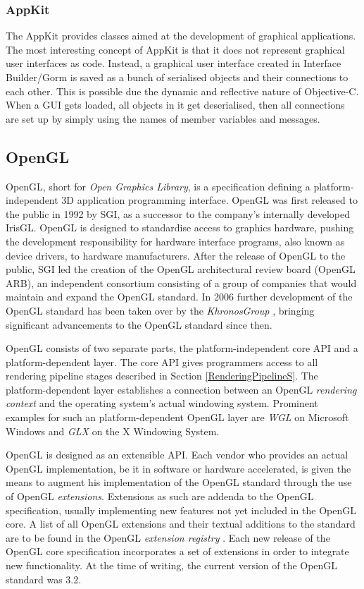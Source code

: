 \subsubsection{AppKit}

The AppKit provides classes aimed at the development of graphical applications.
The most interesting concept of AppKit is that it does not represent graphical
user interfaces as code. Instead, a graphical user interface created in
Interface Builder/Gorm is saved as a bunch of serialised objects and their
connections to each other. This is possible due the dynamic and reflective
nature of Objective-C. When a GUI gets loaded, all objects in it get
deserialised, then all connections are set up by simply using the names of
member variables and messages. 

\subsection{OpenGL}
OpenGL, short for \textit{Open Graphics Library}, is a specification defining a
platform-independent 3D application programming interface. OpenGL was first
released to the public in 1992 by SGI, as a successor to the company's
internally developed IrisGL. OpenGL is designed to standardise access to
graphics hardware, pushing the development responsibility for hardware interface
programs, also known as device drivers, to hardware manufacturers. After the
release of OpenGL to the public, SGI led the creation of the OpenGL
architectural review board (OpenGL ARB)\cite{misc:opengl-arb}, an independent
consortium consisting of a group of companies that would maintain and expand the
OpenGL standard. In 2006 further development of the OpenGL standard has been
taken over by the \textit{KhronosGroup} \cite{misc:opengl-khronos}, bringing
significant advancements to the OpenGL standard since then.

OpenGL consists of two separate parts, the platform-independent core API and a
platform-dependent layer. The core API gives programmers access to all
rendering pipeline stages described in Section \ref{RenderingPipelineS}. The
platform-dependent layer establishes a connection between an OpenGL
\textit{rendering context} and the operating system's actual windowing system.
Prominent examples for such an platform-dependent OpenGL layer are \textit{WGL}
on Microsoft Windows and \textit{GLX} on the X Windowing System.

OpenGL is designed as an extensible API. Each vendor who provides an actual
OpenGL implementation, be it in software or hardware accelerated, is given the
means to augment his implementation of the OpenGL standard through the use of
OpenGL \textit{extensions}. Extensions as such are addenda to the OpenGL
specification, usually implementing new features not yet included in the OpenGL
core. A list of all OpenGL extensions and their textual additions to the
standard are to be found in the OpenGL \textit{extension
registry} \cite{misc:opengl-registry}. Each new release of the OpenGL core
specification incorporates a set of extensions in order to integrate new
functionality. At the time of writing, the current version of the OpenGL
standard was 3.2.

